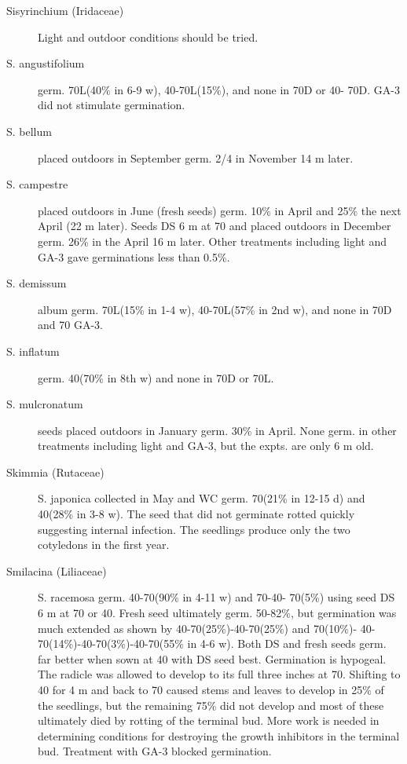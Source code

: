 \begin{description}
\item[Sisyrinchium (Iridaceae)] Light and outdoor conditions should be tried.
\item[S. angustifolium] germ. 70L(40\% in 6-9 w), 40-70L(15\%), and none in 70D or 40-
70D. GA-3 did not stimulate germination.
\item[S. bellum] placed outdoors in September germ. 2/4 in November 14 m later.
\item[S. campestre] placed outdoors in June (fresh seeds) germ. 10\% in April and
25\% the next April (22 m later). Seeds DS 6 m at 70 and placed outdoors in
December germ. 26\% in the April 16 m later. Other treatments including light and
GA-3 gave germinations less than 0.5\%.
\item[S. demissum] album germ. 70L(15\% in 1-4 w), 40-70L(57\% in 2nd w), and none
in 70D and 70 GA-3.
\item[S. inflatum] germ. 40(70\% in 8th w) and none in 70D or 70L.
\item[S. mulcronatum] seeds placed outdoors in January germ. 30\% in April. None
germ. in other treatments including light and GA-3, but the expts. are only 6 m old.

\item[Skimmia (Rutaceae)] S. japonica collected in May and WC germ. 70(21\% in
12-15 d) and 40(28\% in 3-8 w). The seed that did not germinate rotted quickly
suggesting internal infection. The seedlings produce only the two cotyledons in the
first year.

\item[Smilacina (Liliaceae)] S. racemosa germ. 40-70(90\% in 4-11 w) and 70-40-
70(5\%) using seed DS 6 m at 70 or 40. Fresh seed ultimately germ. 50-82\%, but
germination was much extended as shown by 40-70(25\%)-40-70(25\%) and 70(10\%)-
40-70(14\%)-40-70(3\%)-40-70(55\% in 4-6 w). Both DS and fresh seeds germ. far
better when sown at 40 with DS seed best. Germination is hypogeal. The radicle was
allowed to develop to its full three inches at 70. Shifting to 40 for 4 m and back to 70
caused stems and leaves to develop in 25\% of the seedlings, but the remaining 75\%
did not develop and most of these ultimately died by rotting of the terminal bud. More
work is needed in determining conditions for destroying the growth inhibitors in the
terminal bud. Treatment with GA-3 blocked germination.


\end{description}
